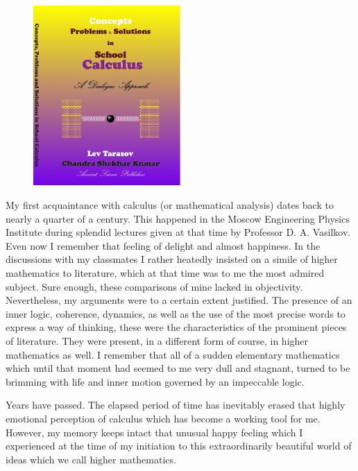 
\begin{figure}
  \begin{center}
    \includegraphics[width=0.5\textwidth]{tarasov-cal/cover}
  \end{center}
\end{figure}

\hspace{5mm}\textcolor{shadow}{My first acquaintance with calculus (or mathematical analysis) dates back to nearly a quarter of a century. This happened in the Moscow Engineering Physics Institute during splendid lectures given at that time by Professor D. A. Vasilkov. Even now I remember that feeling of delight and almost happiness. In the discussions with my classmates I rather heatedly insisted on a simile of higher mathematics to literature, which at that time was to me the most admired subject. Sure enough, these comparisons of mine lacked in objectivity. Nevertheless, my arguments were to a certain extent justified. The presence of an inner logic, coherence, dynamics, as well as the use of the most precise words to express a way of thinking, these were the characteristics of the prominent pieces of literature. They were present, in a different form of course, in higher mathematics as well. I remember that all of a sudden elementary mathematics which until that moment had seemed to me very dull and stagnant, turned to be brimming with life and inner motion governed by an impeccable logic.}

\hspace{5mm}\textcolor{shadow}{Years have passed. The elapsed period of time has inevitably erased that highly emotional perception of calculus which has become a working tool for me. However, my memory keeps intact that unusual happy feeling which I experienced at the time of my initiation to this extraordinarily beautiful world of ideas which we call higher mathematics.}

